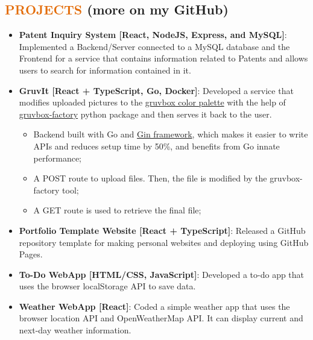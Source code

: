 \documentclass[a4paper, 20pt]{article}
\newcommand{\resumeItem}[2]{
  \item\small{
    \textbf{#1}{: #2 \vspace{-2pt}}
  }
}
\newcommand{\resumeSubItem}[2]{\resumeItem{#1}{#2}\vspace{-3pt}}
\newcommand{\resumeSubHeadingListStart}{\begin{itemize}[leftmargin=*]}
\newcommand{\resumeSubHeadingListEnd}{\end{itemize}}
\begin{document}
\begin{CJK*}{UTF8}{gbsn}
\section{\textcolor[HTML]{E36C09}{\textbf{PROJECTS}} \tiny{(more on my GitHub)}}
\resumeSubHeadingListStart{}
\resumeSubItem{Patent Inquiry System [React, NodeJS, Express, and MySQL]}
      {Implemented a Backend/Server connected to a MySQL database and the Frontend for a service that contains information related to Patents and allows users to search for information contained in it.}
      \vspace{2pt}
      \resumeSubItem{GruvIt [React + TypeScript, Go, Docker]}
      {Developed a service that modifies uploaded pictures to the \href{https://github.com/morhetz/gruvbox}{gruvbox color palette} with the help of \href{https://github.com/paulopacitti/gruvbox-factory}{gruvbox-factory} python package and then serves it back to the user.}
      \begin{itemize}
        \item{Backend built with Go and \href{https://github.com/gin-gonic/gin}{Gin framework}, which makes it easier to write APIs and reduces setup time by 50\%, and benefits from Go innate performance;}
        \item{A POST route to upload files. Then, the file is modified by the gruvbox-factory tool;}
        \item{A GET route is used to retrieve the final file;}
      \end{itemize}
      \vspace{2pt}
      \resumeSubItem{Portfolio Template Website [React + TypeScript]}
      {Released a GitHub repository template for making personal websites and deploying using GitHub Pages.}
      \vspace{2pt}
      \resumeSubItem{To-Do WebApp [HTML/CSS, JavaScript]}
      {Developed a to-do app that uses the browser localStorage API to save data.}
      \vspace{2pt}
      \resumeSubItem{Weather WebApp [React]}
      {Coded a simple weather app that uses the browser location API and OpenWeatherMap API. It can display current and next-day weather information.}
      \vspace{2pt}
\resumeSubHeadingListEnd{}

\clearpage\end{CJK*}
\end{document}
